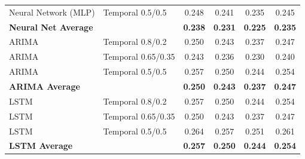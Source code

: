 \documentclass[11pt,a4paper]{article}
\begin{document}
\begin{table}[H]
\begin{tabular}{llcccc}
Neural Network (MLP) & Temporal 0.5/0.5 & 0.248 & 0.241 & 0.235 & 0.245 \\
\textbf{Neural Net Average} & & \textbf{0.238} & \textbf{0.231} & \textbf{0.225} & \textbf{0.235} \\
\midrule
ARIMA & Temporal 0.8/0.2 & 0.250 & 0.243 & 0.237 & 0.247 \\
ARIMA & Temporal 0.65/0.35 & 0.243 & 0.236 & 0.230 & 0.240 \\
ARIMA & Temporal 0.5/0.5 & 0.257 & 0.250 & 0.244 & 0.254 \\
\textbf{ARIMA Average} & & \textbf{0.250} & \textbf{0.243} & \textbf{0.237} & \textbf{0.247} \\
\midrule
LSTM & Temporal 0.8/0.2 & 0.257 & 0.250 & 0.244 & 0.254 \\
LSTM & Temporal 0.65/0.35 & 0.250 & 0.243 & 0.237 & 0.247 \\
LSTM & Temporal 0.5/0.5 & 0.264 & 0.257 & 0.251 & 0.261 \\
\textbf{LSTM Average} & & \textbf{0.257} & \textbf{0.250} & \textbf{0.244} & \textbf{0.254} \\
\bottomrule
\end{tabular}
\end{table}
\end{document}
